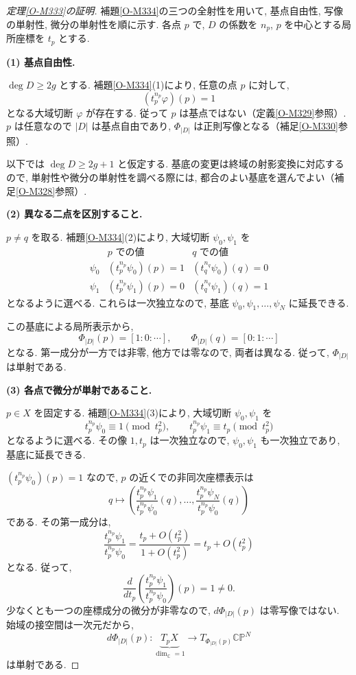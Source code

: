 \documentclass[dvipdfmx,a4paper,11pt]{article} %
\newcommand{\C}{\mathbb{C}}
\theoremstyle{definition}
\numberwithin{equation}{section}
\begin{document}
\begin{proof}[定理\ref{O-M333}の証明]
補題\ref{O-M334}の三つの全射性を用いて,
基点自由性, 写像の単射性, 微分の単射性を順に示す.
各点 $p$ で, $D$ の係数を $n_p$,
$p$ を中心とする局所座標を $t_p$ とする.

\medskip
\noindent
\textbf{(1) 基点自由性.}

$\deg D\geq2g$ とする.
補題\ref{O-M334}(1)により, 任意の点 $p$ に対して,
\[
(t_p^{n_p}\varphi)(p)=1
\]
となる大域切断 $\varphi$ が存在する.
従って $p$ は基点ではない（定義\ref{O-M329}参照）.
$p$ は任意なので $|D|$ は基点自由であり,
$\Phi_{|D|}$ は正則写像となる（補足\ref{O-M330}参照）.

以下では $\deg D\geq2g+1$ と仮定する.
基底の変更は終域の射影変換に対応するので,
単射性や微分の単射性を調べる際には,
都合のよい基底を選んでよい（補足\ref{O-M328}参照）.

\medskip
\noindent
\textbf{(2) 異なる二点を区別すること.}

$p\neq q$ を取る.
補題\ref{O-M334}(2)により, 大域切断 $\psi_0,\psi_1$ を
\[
\begin{array}{c|cc}
 & p\text{ での値} & q\text{ での値}\\ \hline
\psi_0 & (t_p^{n_p}\psi_0)(p)=1 & (t_q^{n_q}\psi_0)(q)=0\\
\psi_1 & (t_p^{n_p}\psi_1)(p)=0 & (t_q^{n_q}\psi_1)(q)=1
\end{array}
\]
となるように選べる.
これらは一次独立なので, 基底
$\psi_0,\psi_1,\ldots,\psi_N$ に延長できる.

この基底による局所表示から,
\[
\Phi_{|D|}(p)=[1:0:\cdots],\qquad
\Phi_{|D|}(q)=[0:1:\cdots]
\]
となる.
第一成分が一方では非零, 他方では零なので, 両者は異なる.
従って, $\Phi_{|D|}$ は単射である.

\medskip
\noindent
\textbf{(3) 各点で微分が単射であること.}

$p\in X$ を固定する.
補題\ref{O-M334}(3)により, 大域切断 $\psi_0,\psi_1$ を
\[
t_p^{n_p}\psi_0\equiv1\pmod{t_p^2},
\qquad
t_p^{n_p}\psi_1\equiv t_p\pmod{t_p^2}
\]
となるように選べる.
その像 $1,t_p$ は一次独立なので,
$\psi_0,\psi_1$ も一次独立であり, 基底に延長できる.

$(t_p^{n_p}\psi_0)(p)=1$ なので,
$p$ の近くでの非同次座標表示は
\[
q\longmapsto
\left(
\frac{t_p^{n_p}\psi_1}{t_p^{n_p}\psi_0}(q),\ldots,
\frac{t_p^{n_p}\psi_N}{t_p^{n_p}\psi_0}(q)
\right)
\]
である.
その第一成分は,
\[
\frac{t_p^{n_p}\psi_1}{t_p^{n_p}\psi_0}
=\frac{t_p+O(t_p^2)}{1+O(t_p^2)}
=t_p+O(t_p^2)
\]
となる.
従って,
\[
\frac{d}{dt_p}
\left(\frac{t_p^{n_p}\psi_1}{t_p^{n_p}\psi_0}\right)(p)
=1\neq0.
\]
少なくとも一つの座標成分の微分が非零なので,
$d\Phi_{|D|}(p)$ は零写像ではない.
始域の接空間は一次元だから,
\[
d\Phi_{|D|}(p):
\underbrace{T_pX}_{\dim_{\C}=1}
\longrightarrow T_{\Phi_{|D|}(p)}\C\mathbb P^N
\]
は単射である.


\end{proof}
\end{document}
